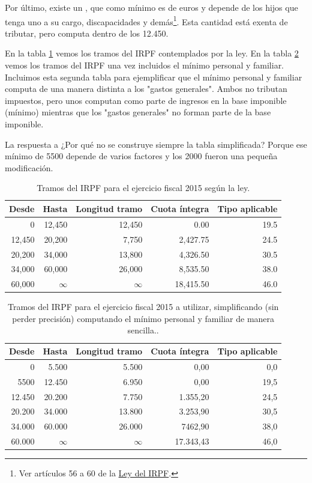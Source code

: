 \documentclass[nochap,palatino,shortheader]{apuntes}
\begin{document}
Por último, existe un , que como mínimo es de  euros y depende de los hijos que tenga uno a su cargo, discapacidades y demás\footnote{Ver artículos 56 a 60 de la \href{https://www.boe.es/buscar/act.php?id=BOE-A-2006-20764&b=29&tn=1&p=20141128}{Ley del IRPF}.}.
Esta cantidad está exenta de tributar, pero computa dentro de los 12.450\texteuro.


En la tabla \ref{tab:Tramos2015IRPF} vemos los tramos del IRPF contemplados por la ley. En la tabla \ref{tab:Tramos2015IRPF_FMM} vemos los tramos del IRPF una vez incluidos el mínimo personal y familiar.
Incluimos esta segunda tabla para ejemplificar que el mínimo personal y familiar computa de una manera distinta a los "gastos generales". Ambos no tributan impuestos, pero unos computan como parte de ingresos en la base imponible (mínimo) mientras que los "gastos generales" no forman parte de la base imponible.

La respuesta a ¿Por qué no se construye siempre la tabla simplificada? Porque ese mínimo de 5500 depende de varios factores y los 2000 fueron una pequeña modificación.


\begin{table}[hbtp]
\centering
\footnotesize
\begin{tabular}{r|r|r|r|r}
\textbf{Desde} & \textbf{Hasta} & \textbf{Longitud tramo} & \textbf{Cuota íntegra} & \textbf{Tipo aplicable} \\ \toprule
0 & 12,450 & 12,450 & 0.00 & 19.5 \\
12,450 & 20,200 & 7,750 & 2,427.75 & 24.5 \\
20,200 & 34,000 & 13,800 & 4,326.50 & 30.5 \\
34,000 & 60,000 & 26,000 & 8,535.50 & 38.0 \\
60,000 & $\infty$ & $\infty$ & 18,415.50 & 46.0 \\
\end{tabular}
\caption{Tramos del IRPF para el ejercicio fiscal 2015 según la ley.}
\label{tab:Tramos2015IRPF}
\end{table}

\begin{table}[hbtp]
\centering
\footnotesize
\begin{tabular}{r|r|r|r|r}
\textbf{Desde} & \textbf{Hasta} & \textbf{Longitud tramo} & \textbf{Cuota íntegra} & \textbf{Tipo aplicable} \\ \toprule
0 & 5.500 & 5.500 & 0,00 & 0,0 \\
5500 & 12.450 & 6.950 & 0,00 & 19,5 \\
12.450 & 20.200 & 7.750 & 1.355,20 & 24,5 \\
20.200 & 34.000 & 13.800 & 3.253,90 & 30,5 \\
34.000 & 60.000 & 26.000 & 7462,90 & 38,0 \\
60.000 & $\infty$ & $\infty$ & 17.343,43 & 46,0 \\
\end{tabular}
\caption{Tramos del IRPF para el ejercicio fiscal 2015 a utilizar,  simplificando (sin perder precisión) computando el mínimo personal y familiar de manera sencilla..}
\label{tab:Tramos2015IRPF_FMM}
\end{table}
\end{document}
